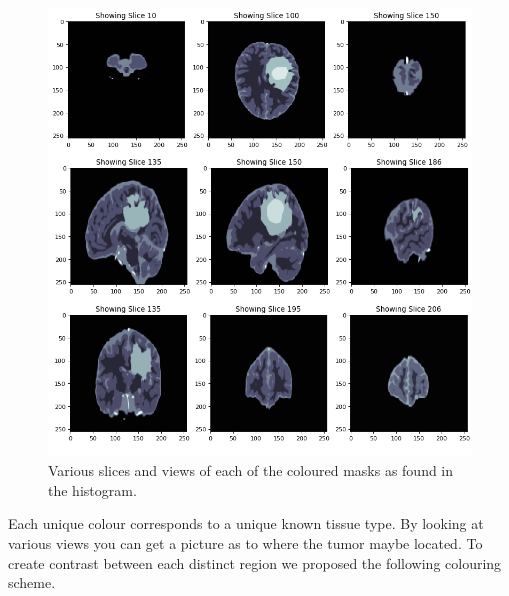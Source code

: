 \begin{figure}[h]
  \centering
  \includegraphics[width=\linewidth]{pictures/labeledMasks.png}
  \caption{Various slices and views of each of the coloured masks as found in the histogram.}
  \label{fig:labeledMasks}
\end{figure}

Each unique colour corresponds to a unique known tissue type.  By looking at various views you can get a picture as to where the tumor maybe located.  To create contrast between each distinct region we proposed the following colouring scheme.

